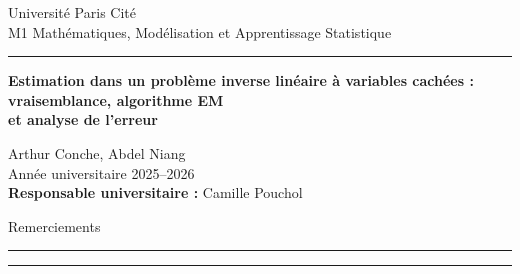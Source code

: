 \documentclass[12pt, a4paper]{article}
\theoremstyle{definition}
\begin{document}
\begin{titlepage}
    \begin{center}

        {\Large Université Paris Cité \\[0.3em]
        M1 Mathématiques, Modélisation et Apprentissage Statistique} \\[1.5em]

        \rule{\textwidth}{0.4pt}

        \vspace{4em}

        {\huge\bfseries Estimation dans un problème inverse linéaire
        à variables cachées :\\[0.6em]
        \large vraisemblance, algorithme EM\\[0.2em]
        et analyse de l'erreur \par}

        \vspace{5em}

        {\Large Arthur Conche, Abdel Niang} \\[1em]
        {\Large Année universitaire 2025--2026} \\[6em]

        \textbf{Responsable universitaire :} Camille Pouchol

    \end{center}
\end{titlepage}

\newpage
\begin{center}
    {\Large Remerciements}
\end{center}
\vspace{0.5em}
\noindent\rule{\textwidth}{1pt}
\vspace{1em}


\vspace{1em}
\noindent\rule{\textwidth}{1pt}

\newpage
\begin{abstract}
\end{abstract}
\end{document}
